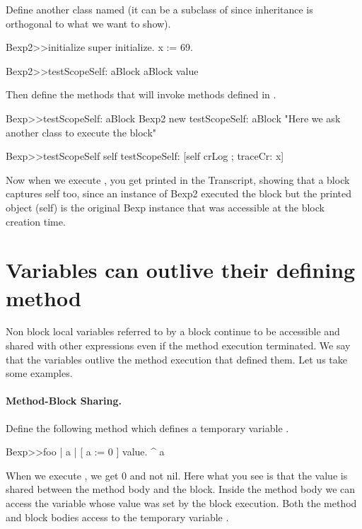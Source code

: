 \documentclass[a4paper,10pt,twoside]{book}
\begin{document}
Define another class named  (it can be a subclass of  since inheritance is orthogonal to what we want to show).
\begin{code}{}
Bexp2>>initialize
	super initialize.
	x := 69.

Bexp2>>testScopeSelf: aBlock
	aBlock value
\end{code}

Then define the methods that will invoke  methods defined in .
\begin{code}{}
Bexp>>testScopeSelf: aBlock
	Bexp2 new testScopeSelf: aBlock "Here we ask another class to execute the block"

Bexp>>testScopeSelf
	self testScopeSelf: [self crLog ; traceCr: x]
\end{code}

Now when we execute , you get  printed in the Transcript, showing that a block captures self too, since an instance of Bexp2 executed the block but the printed object (self) is the original Bexp instance that was accessible at the block creation time.


\section{Variables can outlive their defining method}

Non block local variables referred to by a block continue to be accessible and shared with other expressions even if the method execution terminated. We say that the variables outlive the method execution that defined them.
Let us take some examples.

\paragraph{Method-Block Sharing.} Define the following method  which defines a temporary variable .

\begin{code}{}
Bexp>>foo
	| a |
	[ a := 0 ] value.
	^ a
\end{code}

When we execute , we get 0 and not nil.
Here what you see is that the value is shared between the method body and the block. Inside the method body we can access the variable whose value was set by the block execution.
Both the method  and block bodies access to the temporary variable .
\end{document}
